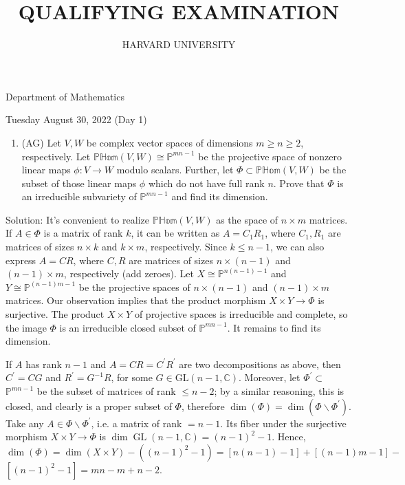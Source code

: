 \documentclass[10pt]{article}
\title{QUALIFYING EXAMINATION }
\author{HARVARD UNIVERSITY}
\date{}
\begin{document}
\maketitle
Department of Mathematics

Tuesday August 30, 2022 (Day 1)

\begin{enumerate}
  \item (AG) Let $V, W$ be complex vector spaces of dimensions $m \geq n \geq 2$, respectively. Let $\mathbb{P H o m}(V, W) \cong \mathbb{P}^{m n-1}$ be the projective space of nonzero linear maps $\phi: V \rightarrow W$ modulo scalars. Further, let $\Phi \subset \mathbb{P H o m}(V, W)$ be the subset of those linear maps $\phi$ which do not have full rank $n$. Prove that $\Phi$ is an irreducible subvariety of $\mathbb{P}^{m n-1}$ and find its dimension.
\end{enumerate}

Solution: It's convenient to realize $\mathbb{P H o m}(V, W)$ as the space of $n \times m$ matrices. If $A \in \Phi$ is a matrix of rank $k$, it can be written as $A=C_{1} R_{1}$, where $C_{1}, R_{1}$ are matrices of sizes $n \times k$ and $k \times m$, respectively. Since $k \leq n-1$, we can also express $A=C R$, where $C, R$ are matrices of sizes $n \times(n-1)$ and $(n-1) \times m$, respectively (add zeroes). Let $X \cong \mathbb{P}^{n(n-1)-1}$ and $Y \cong \mathbb{P}^{(n-1) m-1}$ be the projective spaces of $n \times(n-1)$ and $(n-1) \times m$ matrices. Our observation implies that the product morphism $X \times Y \rightarrow \Phi$ is surjective. The product $X \times Y$ of projective spaces is irreducible and complete, so the image $\Phi$ is an irreducible closed subset of $\mathbb{P}^{m n-1}$. It remains to find its dimension.

If $A$ has rank $n-1$ and $A=C R=C^{\prime} R^{\prime}$ are two decompositions as above, then $C^{\prime}=C G$ and $R^{\prime}=G^{-1} R$, for some $G \in \mathrm{GL}(n-1, \mathbb{C})$. Moreover, let $\Phi^{\prime} \subset$ $\mathbb{P}^{m n-1}$ be the subset of matrices of rank $\leq n-2$; by a similar reasoning, this is closed, and clearly is a proper subset of $\Phi$, therefore $\operatorname{dim}(\Phi)=\operatorname{dim}\left(\Phi \backslash \Phi^{\prime}\right)$. Take any $A \in \Phi \backslash \Phi^{\prime}$, i.e. a matrix of rank $=n-1$. Its fiber under the surjective morphism $X \times Y \rightarrow \Phi$ is $\operatorname{dim} \operatorname{GL}(n-1, \mathbb{C})=(n-1)^{2}-1$. Hence, $\operatorname{dim}(\Phi)=\operatorname{dim}(X \times Y)-\left((n-1)^{2}-1\right)=[n(n-1)-1]+[(n-1) m-1]-$ $\left[(n-1)^{2}-1\right]=m n-m+n-2$.
\end{document}
